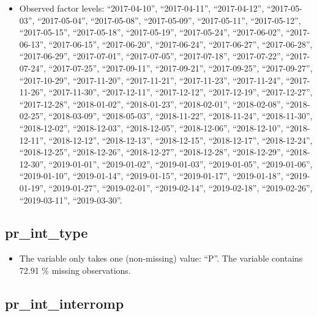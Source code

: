 \documentclass[
  letterpaper,
  DIV=11,
  numbers=noendperiod]{scrartcl}
\providecommand{\tightlist}{%
  \setlength{\itemsep}{0pt}\setlength{\parskip}{0pt}}
\begin{document}
\emini

\begin{itemize}
\tightlist
\item
  Observed factor levels: ``2017-04-10'', ``2017-04-11'',
  ``2017-04-12'', ``2017-05-03'', ``2017-05-04'', ``2017-05-08'',
  ``2017-05-09'', ``2017-05-11'', ``2017-05-12'', ``2017-05-15'',
  ``2017-05-18'', ``2017-05-19'', ``2017-05-24'', ``2017-06-02'',
  ``2017-06-13'', ``2017-06-15'', ``2017-06-20'', ``2017-06-24'',
  ``2017-06-27'', ``2017-06-28'', ``2017-06-29'', ``2017-07-01'',
  ``2017-07-05'', ``2017-07-18'', ``2017-07-22'', ``2017-07-24'',
  ``2017-07-25'', ``2017-09-11'', ``2017-09-21'', ``2017-09-25'',
  ``2017-09-27'', ``2017-10-29'', ``2017-11-20'', ``2017-11-21'',
  ``2017-11-23'', ``2017-11-24'', ``2017-11-26'', ``2017-11-30'',
  ``2017-12-11'', ``2017-12-12'', ``2017-12-19'', ``2017-12-27'',
  ``2017-12-28'', ``2018-01-02'', ``2018-01-23'', ``2018-02-01'',
  ``2018-02-08'', ``2018-02-25'', ``2018-03-09'', ``2018-05-03'',
  ``2018-11-22'', ``2018-11-24'', ``2018-11-30'', ``2018-12-02'',
  ``2018-12-03'', ``2018-12-05'', ``2018-12-06'', ``2018-12-10'',
  ``2018-12-11'', ``2018-12-12'', ``2018-12-13'', ``2018-12-15'',
  ``2018-12-17'', ``2018-12-24'', ``2018-12-25'', ``2018-12-26'',
  ``2018-12-27'', ``2018-12-28'', ``2018-12-29'', ``2018-12-30'',
  ``2019-01-01'', ``2019-01-02'', ``2019-01-03'', ``2019-01-05'',
  ``2019-01-06'', ``2019-01-10'', ``2019-01-14'', ``2019-01-15'',
  ``2019-01-17'', ``2019-01-18'', ``2019-01-19'', ``2019-01-27'',
  ``2019-02-01'', ``2019-02-14'', ``2019-02-18'', ``2019-02-26'',
  ``2019-03-11'', ``2019-03-30''.
\end{itemize}

\fullline

\subsection{pr\_int\_type}\label{pr_int_type}

\begin{itemize}
\tightlist
\item
  The variable only takes one (non-missing) value: ``P''. The variable
  contains 72.91 \% missing observations.
\end{itemize}

\fullline

\subsection{pr\_int\_interromp}\label{pr_int_interromp}
\end{document}
